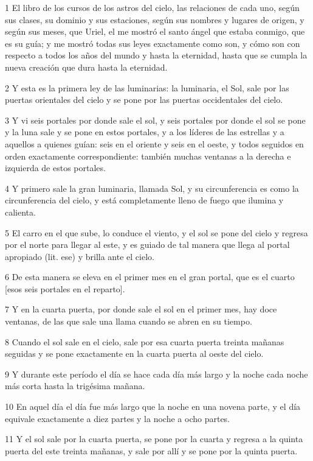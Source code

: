 \par 1 El libro de los cursos de los astros del cielo, las relaciones de cada uno, según sus clases, su dominio y sus estaciones, según sus nombres y lugares de origen, y según sus meses, que Uriel, el me mostró el santo ángel que estaba conmigo, que es su guía; y me mostró todas sus leyes exactamente como son, y cómo son con respecto a todos los años del mundo y hasta la eternidad, hasta que se cumpla la nueva creación que dura hasta la eternidad.
\par 2 Y esta es la primera ley de las luminarias: la luminaria, el Sol, sale por las puertas orientales del cielo y se pone por las puertas occidentales del cielo.
\par 3 Y vi seis portales por donde sale el sol, y seis portales por donde el sol se pone y la luna sale y se pone en estos portales, y a los líderes de las estrellas y a aquellos a quienes guían: seis en el oriente y seis en el oeste, y todos seguidos en orden exactamente correspondiente: también muchas ventanas a la derecha e izquierda de estos portales.
\par 4 Y primero sale la gran luminaria, llamada Sol, y su circunferencia es como la circunferencia del cielo, y está completamente lleno de fuego que ilumina y calienta.
\par 5 El carro en el que sube, lo conduce el viento, y el sol se pone del cielo y regresa por el norte para llegar al este, y es guiado de tal manera que llega al portal apropiado (lit. ese) y brilla ante el cielo.
\par 6 De esta manera se eleva en el primer mes en el gran portal, que es el cuarto [esos seis portales en el reparto].
\par 7 Y en la cuarta puerta, por donde sale el sol en el primer mes, hay doce ventanas, de las que sale una llama cuando se abren en su tiempo.
\par 8 Cuando el sol sale en el cielo, sale por esa cuarta puerta treinta mañanas seguidas y se pone exactamente en la cuarta puerta al oeste del cielo.
\par 9 Y durante este período el día se hace cada día más largo y la noche cada noche más corta hasta la trigésima mañana.
\par 10 En aquel día el día fue más largo que la noche en una novena parte, y el día equivale exactamente a diez partes y la noche a ocho partes.
\par 11 Y el sol sale por la cuarta puerta, se pone por la cuarta y regresa a la quinta puerta del este treinta mañanas, y sale por allí y se pone por la quinta puerta.
